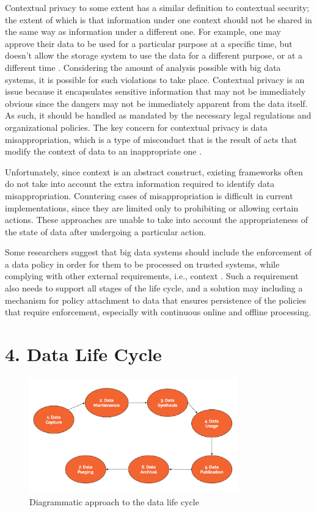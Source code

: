 \documentclass{sigchi}
\begin{document}
Contextual privacy to some extent has a similar definition to contextual security; the extent of which is that information under one context should not be shared in the same way as information under a different one. For example, one may approve their data to be used for a particular purpose at a specific time, but doesn't allow the storage system to use the data for a different purpose, or at a different time \cite{9_wangtan_2013}. Considering the amount of analysis possible with big data systems, it is possible for such violations to take place. Contextual privacy is an issue because it encapsulates sensitive information that may not be immediately obvious since the dangers may not be immediately apparent from the data itself. As such, it should be handled as mandated by the necessary legal regulations and organizational policies. The key concern for contextual privacy is data misappropriation, which is a type of misconduct that is the result of acts that modify the context of data to an inappropriate one \cite{sayaf2015contextual}.

Unfortunately, since context is an abstract construct, existing frameworks often do not take into account the extra information required to identify data misappropriation. Countering cases of misappropriation is difficult in current implementations, since they are limited only to prohibiting or allowing certain actions. These approaches are unable to take into account the appropriateness of the state of data after undergoing a particular action.

Some researchers suggest that big data systems should include the enforcement of a data policy in order for them to be processed on trusted systems, while complying with other external requirements, i.e., context \cite{demchenkobig}. Such a requirement also needs to support all stages of the life cycle, and a solution may including a mechanism for policy attachment to data that ensures persistence of the policies that require enforcement, especially with continuous online and offline processing.

\section{4. Data Life Cycle}
\begin{figure}[ht]
    \includegraphics[height=5cm]{DataLifeCycle}
    \caption{Diagrammatic approach to the data life cycle}
    \label{fig:DataLifeCycle}
\end{figure}
\end{document}
